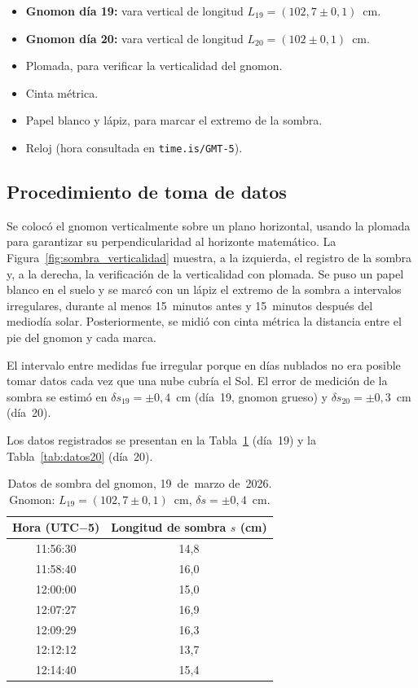 \begin{itemize}
  \item \textbf{Gnomon día 19:} vara vertical de longitud
        $L_{19} = (102{,}7 \pm 0{,}1)$~cm.
  \item \textbf{Gnomon día 20:} vara vertical de longitud
        $L_{20} = (102 \pm 0{,}1)$~cm.
  \item Plomada, para verificar la verticalidad del gnomon.
  \item Cinta métrica.
  \item Papel blanco y lápiz, para marcar el extremo de la sombra.
  \item Reloj (hora consultada en \texttt{time.is/GMT-5}).
\end{itemize}

\subsection{Procedimiento de toma de datos}

Se colocó el gnomon verticalmente sobre un plano horizontal,
usando la plomada para garantizar su perpendicularidad al horizonte
matemático. La Figura~\ref{fig:sombra_verticalidad} muestra, a la izquierda, el registro de la sombra y, a la derecha, la verificación de la verticalidad con plomada.
Se puso un papel blanco en el suelo y se marcó con un lápiz el extremo
de la sombra a intervalos irregulares, durante al menos 15~minutos antes
y 15~minutos después del mediodía solar.
Posteriormente, se midió con cinta métrica la distancia entre el pie
del gnomon y cada marca.

El intervalo entre medidas fue irregular porque en días nublados no era
posible tomar datos cada vez que una nube cubría el Sol.
El error de medición de la sombra se estimó en $\delta s_{19} = \pm 0{,}4$~cm
(día~19, gnomon grueso) y $\delta s_{20} = \pm 0{,}3$~cm (día~20).

Los datos registrados se presentan en la Tabla~\ref{tab:datos19}
(día~19) y la Tabla~\ref{tab:datos20} (día~20).

\begin{table}[H]
  \centering
  \caption{Datos de sombra del gnomon, 19~de~marzo de~2026.
           Gnomon: $L_{19} = (102{,}7 \pm 0{,}1)$~cm,
           $\delta s = \pm 0{,}4$~cm.}
  \label{tab:datos19}
  \begin{tabular}{cc}
    \toprule
    Hora (UTC$-$5) & Longitud de sombra $s$ (cm) \\
    \midrule
    11:56:30 & 14{,}8 \\
    11:58:40 & 16{,}0 \\
    12:00:00 & 15{,}0 \\
    12:07:27 & 16{,}9 \\
    12:09:29 & 16{,}3 \\
    12:12:12 & 13{,}7 \\
    12:14:40 & 15{,}4 \\
    \bottomrule
  \end{tabular}
\end{table}

